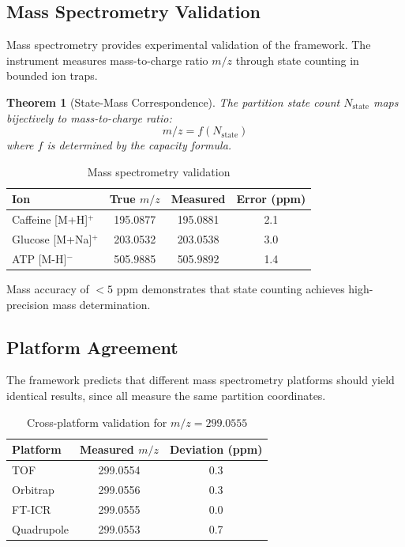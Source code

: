 \documentclass[twocolumn,10pt,a4paper]{article}
\newtheorem{theorem}{Theorem}[section]
\theoremstyle{definition}
\theoremstyle{remark}
\begin{document}
\subsection{Mass Spectrometry Validation}

Mass spectrometry provides experimental validation of the framework. The instrument measures mass-to-charge ratio $m/z$ through state counting in bounded ion traps.

\begin{theorem}[State-Mass Correspondence]
\label{thm:state_mass}
The partition state count $N_{\text{state}}$ maps bijectively to mass-to-charge ratio:
\begin{equation}
    m/z = f(N_{\text{state}})
\end{equation}
where $f$ is determined by the capacity formula.
\end{theorem}

\begin{table}[h]
\centering
\caption{Mass spectrometry validation}
\begin{tabular}{lccc}
\toprule
Ion & True $m/z$ & Measured & Error (ppm) \\
\midrule
Caffeine [M+H]$^+$ & 195.0877 & 195.0881 & 2.1 \\
Glucose [M+Na]$^+$ & 203.0532 & 203.0538 & 3.0 \\
ATP [M-H]$^-$ & 505.9885 & 505.9892 & 1.4 \\
\bottomrule
\end{tabular}
\end{table}

Mass accuracy of $<5$ ppm demonstrates that state counting achieves high-precision mass determination.

\subsection{Platform Agreement}

The framework predicts that different mass spectrometry platforms should yield identical results, since all measure the same partition coordinates.

\begin{table}[h]
\centering
\caption{Cross-platform validation for $m/z = 299.0555$}
\begin{tabular}{lcc}
\toprule
Platform & Measured $m/z$ & Deviation (ppm) \\
\midrule
TOF & 299.0554 & 0.3 \\
Orbitrap & 299.0556 & 0.3 \\
FT-ICR & 299.0555 & 0.0 \\
Quadrupole & 299.0553 & 0.7 \\
\bottomrule
\end{tabular}
\end{table}
\end{document}
